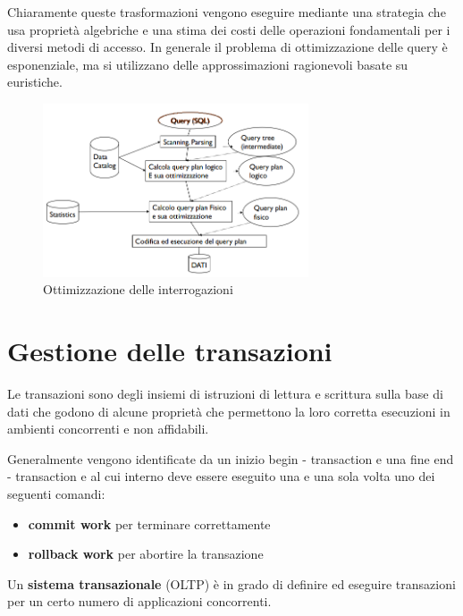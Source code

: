 Chiaramente queste trasformazioni vengono eseguire mediante una strategia che
usa proprietà algebriche e una stima dei costi delle operazioni fondamentali per
i diversi metodi di accesso. In generale il problema di ottimizzazione delle
query è esponenziale, ma si utilizzano delle approssimazioni ragionevoli basate
su euristiche.
\begin{figure}
      \centering
      \includegraphics[width=0.7\textwidth]{./img/DBMS/Ottimizzazione_query.png}
      \caption{Ottimizzazione delle interrogazioni}
      \label{fig:Query_Optimization}
\end{figure}
\section{Gestione delle transazioni}
Le transazioni sono degli insiemi di istruzioni di lettura e scrittura sulla base
di dati che godono di alcune proprietà che permettono la loro corretta esecuzioni
in ambienti concorrenti e non affidabili.

Generalmente vengono identificate da un inizio begin - transaction e una fine
end - transaction e al cui interno deve essere eseguito una e una sola
volta uno dei seguenti comandi:
\begin{itemize}
      \item \textbf{commit work} per terminare correttamente
      \item \textbf{rollback work} per abortire la transazione
\end{itemize}

Un \textbf{sistema transazionale} (OLTP) è in grado di definire ed eseguire
transazioni per un certo numero di applicazioni concorrenti.

